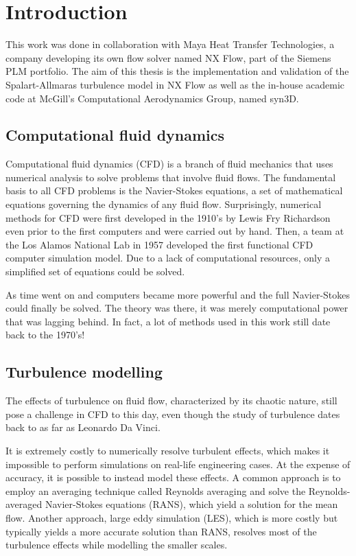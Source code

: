 \chapter{Introduction}
This work was done in collaboration with Maya Heat Transfer Technologies, a company developing its own flow solver named NX Flow, part of the Siemens PLM portfolio. The aim of this thesis is the implementation and validation of the Spalart-Allmaras turbulence model in NX Flow as well as the in-house academic code at McGill's Computational Aerodynamics Group, named syn3D.


\section{Computational fluid dynamics}
Computational fluid dynamics (CFD) is a branch of fluid mechanics that uses numerical analysis to solve problems that involve fluid flows. The fundamental basis to all CFD problems is the Navier-Stokes equations, a set of mathematical equations governing the dynamics of any fluid flow. Surprisingly, numerical methods for CFD were first developed in the 1910's by Lewis Fry Richardson even prior to the first computers and were carried out by hand. Then, a team at the Los Alamos National Lab in 1957 developed the first functional CFD computer simulation model. Due to a lack of computational resources, only a simplified set of equations could be solved. 

As time went on and computers became more powerful and the full Navier-Stokes could finally be solved. The theory was there, it was merely computational power that was lagging behind. In fact, a lot of methods used in this work still date back to the 1970's!
\section{Turbulence modelling}
The effects of turbulence on fluid flow, characterized by its chaotic nature, still pose a challenge in CFD to this day, even though the study of turbulence dates back to as far as Leonardo Da Vinci. 

It is extremely costly to numerically resolve turbulent effects, which makes it impossible to perform simulations on real-life engineering cases. At the expense of accuracy, it is possible to instead model these effects. A common approach is to employ an averaging technique called Reynolds averaging and solve the Reynolds-averaged Navier-Stokes equations (RANS), which yield a solution for the mean flow. Another approach, large eddy simulation (LES), which is more costly but typically yields a more accurate solution than RANS, resolves most of the turbulence effects while modelling the smaller scales. 

